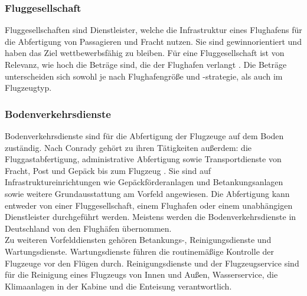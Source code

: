 \subsubsection{Fluggesellschaft}
Fluggesellschaften sind Dienstleister, welche die Infrastruktur eines Flughafens für die 
Abfertigung von Passagieren und Fracht nutzen. 
Sie sind gewinnorientiert und haben das Ziel wettbewerbsfähig zu bleiben. 
Für eine Fluggesellschaft ist von Relevanz, wie hoch die Beträge
sind, die der Flughafen verlangt \cite{schaar2010analysis}. 
Die Beträge unterscheiden sich sowohl je nach Flughafengröße und -strategie, als auch im Flugzeugtyp.

\subsubsection{Bodenverkehrsdienste} %
%
Bodenverkehrsdienste sind für die Abfertigung der Flugzeuge auf dem Boden zuständig.
Nach Conrady \cite{conrady2019luftverkehr} gehört zu ihren Tätigkeiten außerdem:  
die Fluggastabfertigung, administrative Abfertigung sowie Transportdienste von Fracht, Post und Gepäck bis zum Flugzeug \cite{mensen2013handbuch}.
Sie sind auf Infrastruktureinrichtungen wie Gepäckförderanlagen und Betankungsanlagen 
sowie weitere Grundausstattung am Vorfeld angewiesen. 
Die Abfertigung kann entweder von einer Fluggesellschaft, einem Flughafen oder einem 
unabhängigen Dienstleister durchgeführt werden. 
Meistens werden die Bodenverkehrsdienste in Deutschland von den Flughäfen übernommen.\\ %
%
Zu weiteren Vorfelddiensten gehören Betankungs-, Reinigungsdienste und Wartungsdienste.
Wartungsdienste führen die routinemäßige Kontrolle der Flugzeuge vor den Flügen durch.
Reinigungsdienste und der Flugzeugservice sind für die Reinigung eines Flugzeugs 
von Innen und Außen, Wasserservice, die Klimaanlagen in der Kabine und die Enteisung verantwortlich.
%
%
%
